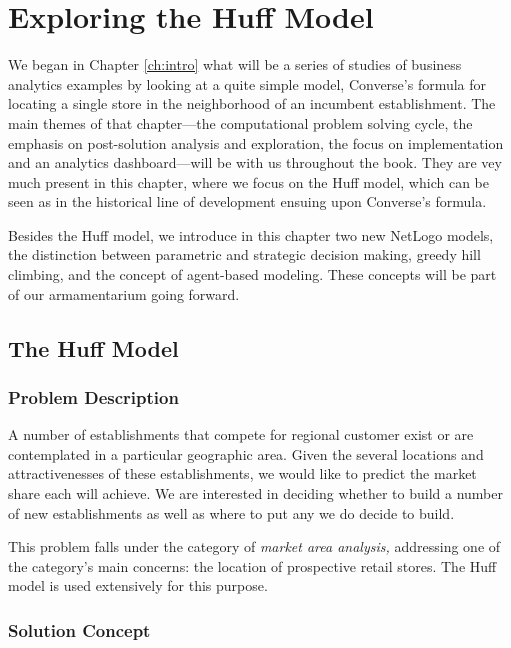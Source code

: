 \chapter{Exploring the Huff Model\label{ch:huff}}

 We began in Chapter \ref{ch:intro}  what will be a series of studies of business analytics  examples by looking at a quite simple model, Converse's formula for locating a single store in the neighborhood of an incumbent establishment.  The main themes of that chapter---the computational problem solving cycle, the emphasis on post-solution analysis and exploration, the focus on implementation and an analytics dashboard---will be with us throughout the book. They are vey much present in this chapter, where we focus on the Huff model, which can be seen as in the historical line of development ensuing upon Converse's formula.
 
 Besides the Huff model, we introduce in this chapter two new NetLogo models, the distinction between parametric and strategic decision making, greedy hill climbing, and the concept of agent-based modeling. These concepts will be part of our armamentarium going forward.
 

\section{The Huff Model}



\subsection{Problem Description}

A number of  establishments that compete for regional customer exist or are contemplated in a particular geographic area.  Given the several locations and attractivenesses of these establishments, we would like to predict the market share each will achieve.  We are interested in deciding  whether to build a number of new establishments as well as where to put any we do decide to build.

This problem falls under the category of \emph{market area analysis,} addressing one of the category's main concerns: the location of prospective retail stores. The Huff model is used extensively for this purpose.

\subsection{Solution Concept}

